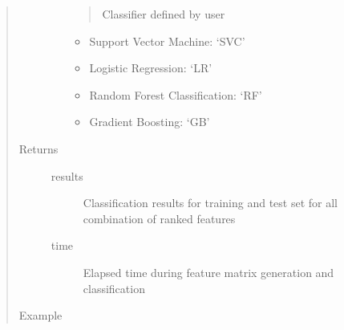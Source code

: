 \documentclass[letterpaper,10pt,english]{sphinxmanual}
\begin{document}
\begin{fulllineitems}
\begin{quote}
\begin{description}
\begin{itemize}
\begin{quote}
Classifier defined by user
\end{quote}
\begin{itemize}
\item {} 
Support Vector Machine: ‘SVC’

\item {} 
Logistic Regression: ‘LR’

\item {} 
Random Forest Classification: ‘RF’

\item {} 
Gradient Boosting: ‘GB’

\end{itemize}


\end{itemize}

\item[{Returns}] \leavevmode\begin{description}
\item[{results}] \leavevmode
Classification results for training and test set for all combination of ranked features

\item[{time}] \leavevmode
Elapsed time during feature matrix generation and classification

\end{description}

\item[{Example}] \leavevmode
\begin{sphinxVerbatim}[commandchars=\\\{\}]
   

  
  


\end{sphinxVerbatim}
\end{description}
\end{quote}
\end{fulllineitems}
\end{document}
